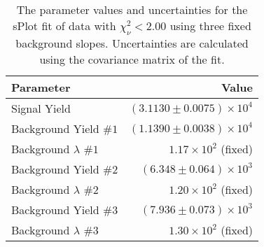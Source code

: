 
\begin{table}[ht]
    \begin{center}
        \begin{tabular}{lr}\toprule
            Parameter & Value \\\midrule
            Signal Yield & $(3.1130 \pm 0.0075) \times 10^{4}$ \\
            Background Yield $\#1$ & $(1.1390 \pm 0.0038) \times 10^{4}$ \\
            Background $\lambda$ $\#1$ & $1.17 \times 10^{2}$ (fixed) \\
            Background Yield $\#2$ & $(6.348 \pm 0.064) \times 10^{3}$ \\
            Background $\lambda$ $\#2$ & $1.20 \times 10^{2}$ (fixed) \\
            Background Yield $\#3$ & $(7.936 \pm 0.073) \times 10^{3}$ \\
            Background $\lambda$ $\#3$ & $1.30 \times 10^{2}$ (fixed) \\\bottomrule
        \end{tabular}
        \caption{The parameter values and uncertainties for the sPlot fit of data with $\chi^2_\nu < 2.00$ using three fixed background slopes. Uncertainties are calculated using the covariance matrix of the fit.}\label{tab:splot-fit-results-chisqdof-2.00-fixed-3}
    \end{center}
\end{table}
